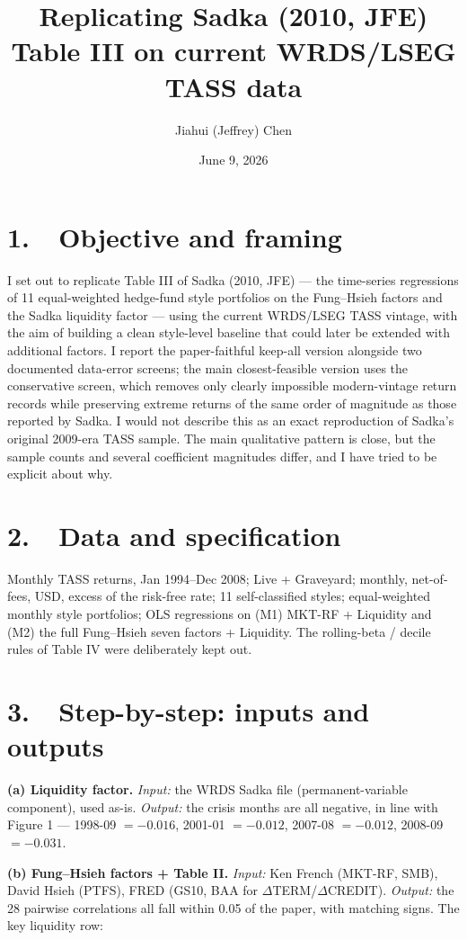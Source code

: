 \documentclass[10pt]{article}
\title{\vspace{-1.6em}Replicating Sadka (2010, JFE) Table III on current WRDS/LSEG TASS data}
\author{Jiahui (Jeffrey) Chen}
\date{June 9, 2026}
\begin{document}
\maketitle
\vspace{-2.2em}

\section*{1.\ \ Objective and framing}
I set out to replicate Table III of Sadka (2010, JFE) --- the time-series regressions of 11
equal-weighted hedge-fund style portfolios on the Fung--Hsieh factors and the Sadka liquidity
factor --- using the current WRDS/LSEG TASS vintage, with the aim of building a clean style-level
baseline that could later be extended with additional factors. I report the paper-faithful
keep-all version alongside two documented data-error screens; the main closest-feasible version
uses the conservative screen, which removes only clearly impossible modern-vintage return records
while preserving extreme returns of the same order of magnitude as those reported by Sadka. I
would not describe this as an exact reproduction of Sadka's original 2009-era TASS sample. The
main qualitative pattern is close, but the sample counts and several coefficient magnitudes
differ, and I have tried to be explicit about why.

\section*{2.\ \ Data and specification}
Monthly TASS returns, Jan 1994--Dec 2008; Live + Graveyard; monthly, net-of-fees, USD, excess of
the risk-free rate; 11 self-classified styles; equal-weighted monthly style portfolios; OLS
regressions on (M1) MKT-RF + Liquidity and (M2) the full Fung--Hsieh seven factors + Liquidity.
The rolling-beta / decile rules of Table IV were deliberately kept out.

\section*{3.\ \ Step-by-step: inputs and outputs}
\textbf{(a) Liquidity factor.} \emph{Input:} the WRDS Sadka file (permanent-variable component),
used as-is. \emph{Output:} the crisis months are all negative, in line with Figure 1 --- 1998-09
$=-0.016$, 2001-01 $=-0.012$, 2007-08 $=-0.012$, 2008-09 $=-0.031$.

\textbf{(b) Fung--Hsieh factors + Table II.} \emph{Input:} Ken French (MKT-RF, SMB), David Hsieh
(PTFS), FRED (GS10, BAA for $\Delta$TERM/$\Delta$CREDIT). \emph{Output:} the 28 pairwise
correlations all fall within 0.05 of the paper, with matching signs. The key liquidity row:
\end{document}
